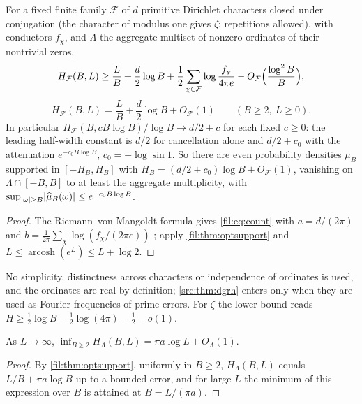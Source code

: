 \begin{corollary}\label{fil:cor:dirsupport}\label{rec:thm:logfilter}
For a fixed finite family $\mathcal F$ of $d$ primitive Dirichlet characters closed under conjugation (the
character of modulus one gives $\zeta$; repetitions allowed), with conductors $f_\chi$, and $\Lambda$ the aggregate
multiset of nonzero ordinates of their nontrivial zeros,
\[
 H_{\mathcal F}(B,L)\ge\frac LB+\frac d2\log B+\frac12\sum_{\chi\in\mathcal F}\log\frac{f_\chi}{4\pi e}-O_{\mathcal F}\Bigl(\frac{\log^2B}B\Bigr),\]
\[
 H_{\mathcal F}(B,L)=\frac LB+\frac d2\log B+O_{\mathcal F}(1)\qquad(B\ge2,\ L\ge0).
\]
In particular $H_{\mathcal F}(B,cB\log B)/\log B\to d/2+c$ for each fixed $c\ge0$: the leading half-width
constant is $d/2$ for cancellation alone and $d/2+c_0$ with the attenuation $e^{-c_0B\log B}$, $c_0=-\log\sin1$.
So there are even probability densities $\mu_B$ supported in $[-H_B,H_B]$ with
$H_B=(d/2+c_0)\log B+O_{\mathcal F}(1)$, vanishing on $\Lambda\cap[-B,B]$ to at least the aggregate
multiplicity, with $\sup_{\lvert\omega\rvert\ge B}\lvert\widehat\mu_B(\omega)\rvert\le e^{-c_0B\log B}$.
\end{corollary}

\begin{proof}
The Riemann--von Mangoldt formula gives \eqref{fil:eq:count} with $a=d/(2\pi)$ and
$b=\frac1{2\pi}\sum_\chi\log(f_\chi/(2\pi e))$ \cite{Davenport2000Multiplicative,MontgomeryVaughan2007Multiplicative,BennettMartinOBryantRechnitzer2021Counting};
apply \cref{fil:thm:optsupport} and $L\le\operatorname{arcosh}(e^L)\le L+\log2$.
\end{proof}

No simplicity, distinctness across characters or independence of ordinates is used, and the ordinates are
real by definition; \cref{src:thm:dgrh} enters only when they are used as Fourier frequencies of prime errors.
For $\zeta$ the lower bound reads $H\ge\tfrac12\log B-\tfrac12\log(4\pi)-\tfrac12-o(1)$.

\begin{corollary}\label{fil:cor:free}
As $L\to\infty$, $\inf_{B\ge2}H_\Lambda(B,L)=\pi a\log L+O_\Lambda(1)$.
\end{corollary}

\begin{proof}
By \cref{fil:thm:optsupport}, uniformly in $B\ge2$, $H_\Lambda(B,L)$ equals $L/B+\pi a\log B$ up to a bounded
error, and for large $L$ the minimum of this expression over $B$ is attained at $B=L/(\pi a)$.
\end{proof}

